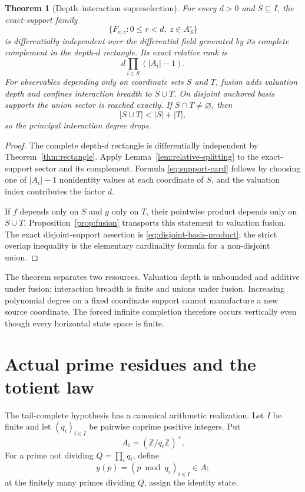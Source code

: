 \documentclass[11pt]{article}
\newtheorem{theorem}{Theorem}[section]
\theoremstyle{definition}
\theoremstyle{remark}
\begin{document}
\begin{theorem}[Depth--interaction superselection]\label{thm:interaction}
For every \(d>0\) and \(S\subseteq I\), the exact-support family
\[
 \{F_{r,z}:0\leq r<d,\ z\in A_S^\circ\}
\]
is differentially independent over the differential field generated by its complete complement
in the depth-\(d\) rectangle.  Its exact relative rank is
\begin{equation}\label{eq:support-rank}
 d\prod_{i\in S}(|A_i|-1).
\end{equation}
For observables depending only on coordinate sets \(S\) and \(T\), fusion adds valuation depth
and confines interaction breadth to \(S\cup T\).  On disjoint anchored basis supports the union
sector is reached exactly.  If \(S\cap T\neq\varnothing\), then
\[
 |S\cup T|<|S|+|T|,
\]
so the principal interaction degree drops.
\end{theorem}

\begin{proof}
The complete depth-\(d\) rectangle is differentially independent by
Theorem~\ref{thm:rectangle}.  Apply Lemma~\ref{lem:relative-splitting} to the exact-support sector
and its complement.  Formula \eqref{eq:support-card} follows by choosing one of
\(|A_i|-1\) nonidentity values at each coordinate of \(S\), and the valuation index contributes
the factor \(d\).

If \(f\) depends only on \(S\) and \(g\) only on \(T\), their pointwise product depends only on
\(S\cup T\).  Proposition~\ref{prop:fusion} transports this statement to valuation fusion.  The
exact disjoint-support assertion is \eqref{eq:disjoint-basis-product}; the strict overlap
inequality is the elementary cardinality formula for a non-disjoint union.
\end{proof}

The theorem separates two resources.  Valuation depth is unbounded and additive under fusion;
interaction breadth is finite and unions under fusion.  Increasing polynomial degree on a fixed
coordinate support cannot manufacture a new source coordinate.  The forced infinite completion
therefore occurs vertically even though every horizontal state space is finite.

\section{Actual prime residues and the totient law}\label{sec:primes}

The tail-complete hypothesis has a canonical arithmetic realization.  Let \(I\) be finite and let
\((q_i)_{i\in I}\) be pairwise coprime positive integers.  Put
\[
 A_i=(\mathbb Z/q_i\mathbb Z)^\times.
\]
For a prime not dividing \(Q=\prod_iq_i\), define
\[
 y(p)=(p\bmod q_i)_{i\in I}\in A;
\]
at the finitely many primes dividing \(Q\), assign the identity state.
\end{document}
